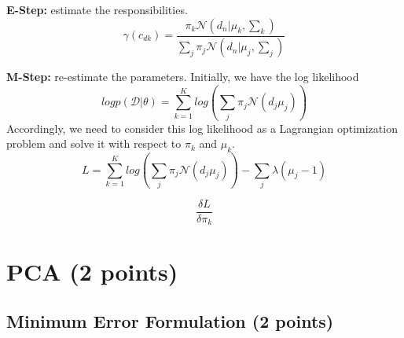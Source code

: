 \documentclass[12pt,a4paper]{article}
\begin{document}
	\noindent \textbf{E-Step:} estimate the responsibilities. 
	\begin{equation}
		\gamma (c_{dk}) = \frac{\pi_k\mathcal{N}(d_n|\mu_k, \sum_{k})}{\sum_{j}\pi_j\mathcal{N}(d_n|\mu_j, \sum_{j})}
	\end{equation}

	\noindent \textbf{M-Step:} re-estimate the parameters. Initially, we have the log likelihood
	\begin{equation}
		log p(\mathcal{D}|\theta)= \sum_{k=1}^{K}log(\sum_{j}\pi_j\mathcal{N}(d_j \mu_j))
	\end{equation}
	Accordingly, we need to consider this log likelihood as a Lagrangian optimization problem and solve it with respect to $\pi_k$ and $\mu_k$.
	\begin{equation}
		L = \sum_{k=1}^{K}log(\sum_{j}\pi_j\mathcal{N}(d_j \mu_j)) - \sum_{j}\lambda(\mu_j-1)
	\end{equation}
	
	\begin{equation}
		\frac{\delta L}{\delta \pi_k}
	\end{equation}
		
	\section{PCA (2 points)}
	\subsection{Minimum Error Formulation (2 points)}
	
\end{document}
